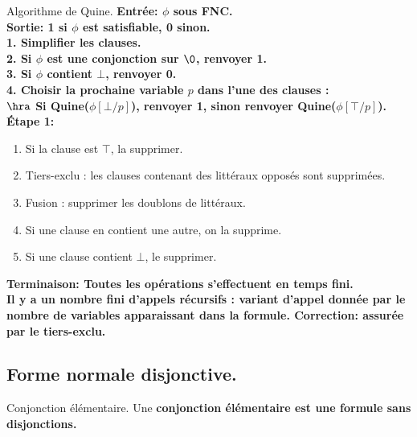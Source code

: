 \documentclass[french, 11pt]{article}
\begin{document}
\vspace*{-0.7cm}

\begin{defi}{Algorithme de Quine.}{}
    \bf{Entrée:} $\phi$ sous FNC.\\
    \bf{Sortie:} 1 si $\phi$ est satisfiable, 0 sinon.\\
    1. Simplifier les clauses.\\
    2. Si $\phi$ est une conjonction sur $\0$, renvoyer 1.\\
    3. Si $\phi$ contient $\bot$, renvoyer 0.\\
    4. Choisir la prochaine variable $p$ dans l'une des clauses :\\
    \hspace*{1em}$\hra$ Si Quine($\phi[\bot/p]$), renvoyer 1, sinon renvoyer Quine($\phi[\top/p]$).\n
    \bf{Étape 1:}
    \begin{enumerate}[]
        \item Si la clause est $\top$, la supprimer.
        \item Tiers-exclu : les clauses contenant des littéraux opposés sont supprimées.
        \item Fusion : supprimer les doublons de littéraux.
        \item Si une clause en contient une autre, on la supprime.
        \item Si une clause contient $\bot$, le supprimer.
    \end{enumerate}
    \bf{Terminaison:} Toutes les opérations s'effectuent en temps fini.\\
    Il y a un nombre fini d'appels récursifs  : variant d'appel donnée par le nombre de variables apparaissant dans la formule.\n
    \bf{Correction:} assurée par le tiers-exclu.
\end{defi}

\subsection{Forme normale disjonctive.}

\begin{defi}{Conjonction élémentaire.}{}
    Une \bf{conjonction élémentaire} est une formule sans disjonctions.
\end{defi}

\vspace*{-0.5cm}
\end{document}
